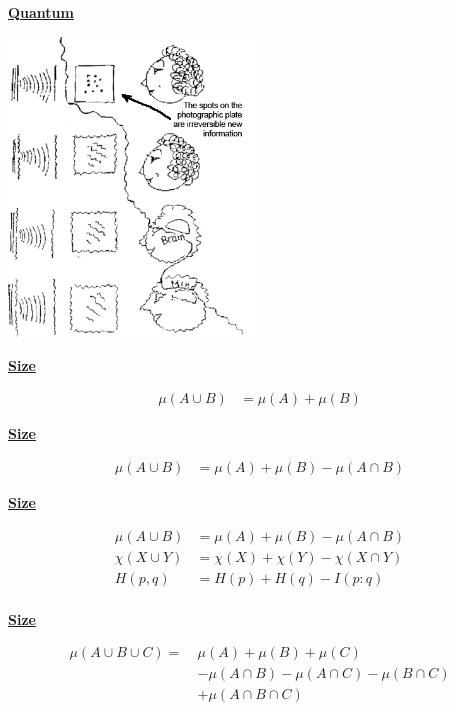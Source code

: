 \documentclass[11pt]{article}
\def\heading #1{\centerline{\underline{\bf\LARGE #1}}}
\def\vsp {\vskip 0.5cm}
\begin{document}
\newpage %

\heading{Quantum}
\vsp
\centerline{\includegraphics[width=0.5\textwidth]{Bell.png}}

\newpage %

\heading{Size}
\vsp
\begin{align*}
    \mu(A\cup B) &= \mu(A) + \mu(B)
\end{align*}

\newpage %

\heading{Size}
\vsp
\begin{align*}
    \mu(A\cup B) &= \mu(A) + \mu(B) - \mu(A\cap B)
\end{align*}

\newpage %

\heading{Size}
\vsp
\begin{align*}
    \mu(A\cup B) &= \mu(A) + \mu(B) - \mu(A\cap B) \\
    \chi(X\cup Y) &= \chi(X) + \chi(Y) - \chi(X\cap Y) \\
    H(p, q) &= H(p) + H(q) - I(p:q) \\
\end{align*}

\newpage %

\heading{Size}
\vsp
\begin{align*}
\mu(A\cup B\cup C) = \ &\mu(A) + \mu(B) + \mu(C)  \\
                     &- \mu(A\cap B) - \mu(A\cap C) - \mu(B\cap C) \\
                     &+ \mu(A\cap B \cap C)
\end{align*}
\end{document}
